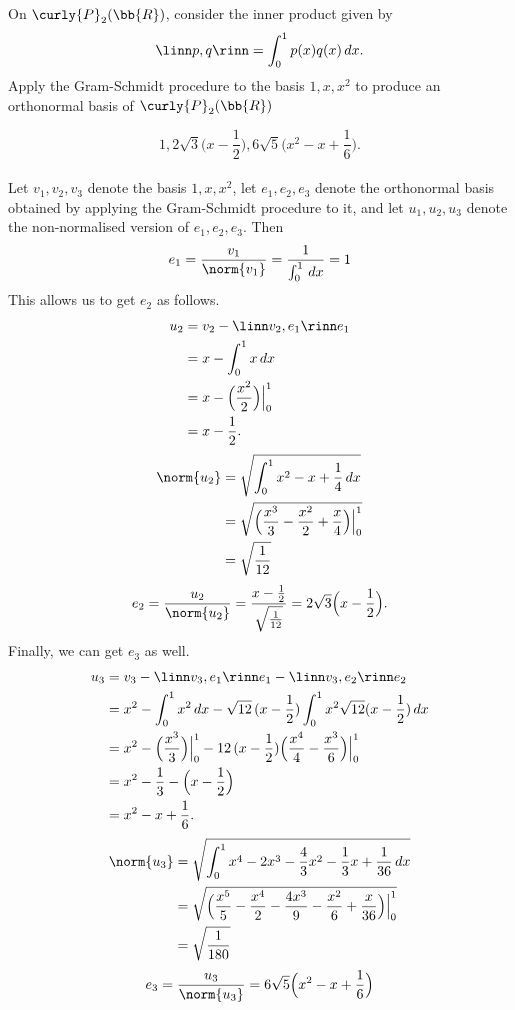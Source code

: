 \documentclass[12pt, letterpaper]{hmcpset}
\begin{document}
\pagebreak

\begin{problem}[5]
	On $\curly{P}_2(\bb{R})$, consider the inner product given by
	\[
		\linn p, q \rinn = \int_0^1 p(x) q(x) \, dx.
	\]
	Apply the Gram-Schmidt procedure to the basis $1, x, x^2$ to produce an orthonormal basis of $\curly{P}_2(\bb{R})$
\end{problem}

\begin{solution}
	\[
		\boxed{
			1, 2 \sqrt 3 \Big ( x - \frac{1}{2} \Big ), 6 \sqrt 5 \Big ( x^2 - x + \frac{1}{6} \Big ).
		}
	\] \\
	Let $v_1, v_2, v_3$ denote the basis $1, x, x^2$, let $e_1, e_2, e_3$ denote the orthonormal basis obtained by applying the Gram-Schmidt procedure to it, and let $u_1, u_2, u_3$ denote the non-normalised version of $e_1, e_2, e_3$. Then
	\[
		e_1 = \frac{v_1}{\norm{v_1}} = \frac{1}{\int_0^1 \, dx} = 1
	\]
	This allows us to get $e_2$ as follows.
	\[
		\begin{split}
			u_2 & = v_2 - \linn v_2, e_1 \rinn e_1 \\
			    & = x - \int_0^1 x \, dx \\
			    & = x - \Big ( \frac{x^2}{2} \Big ) \Big |_0^1 \\
			    & = x - \frac{1}{2}.
		\end{split}
	\]
	\[
		\begin{split}
			\norm{u_2} & = \sqrt{\int_0^1 x^2 - x + \frac{1}{4} \, dx} \\
				   & = \sqrt{\Big ( \frac{x^3}{3} - \frac{x^2}{2} + \frac{x}{4} \Big ) \Big |_0^1} \\
				   & = \sqrt{\frac{1}{12}}
		\end{split}
	\]
	\[
		e_2 = \frac{u_2}{\norm{u_2}} \\ = \frac{x - \frac{1}{2}}{\sqrt{\frac{1}{12}}} = 2 \sqrt{3} \Big ( x - \frac{1}{2} \Big ).
	\]
	Finally, we can get $e_3$ as well.
	\[
		\begin{split}
			u_3 & = v_3 - \linn v_3, e_1 \rinn e_1 - \linn v_3, e_2 \rinn e_2 \\
			    & = x^2 - \int_0^1 x^2 \, dx - \sqrt{12} \, (x - \frac{1}{2}) \int_0^1 x^2 \sqrt{12} (x - \frac{1}{2}) \, dx \\
			    & = x^2 - \Big ( \frac{x^3}{3} \Big ) \Big |_0^1 - 12 \, (x - \frac{1}{2}) \Big ( \frac{x^4}{4} - \frac{x^3}{6} \Big ) \Big |_0^1 \\
			    & = x^2 - \frac{1}{3} - \Big ( x - \frac{1}{2} \Big ) \\
			    & = x^2 - x + \frac{1}{6}.
		\end{split}
	\]
	\[
		\begin{split}
			\norm{u_3} & = \sqrt{\int_0^1 x^4 - 2x^3 - \frac{4}{3} x^2 - \frac{1}{3} x + \frac{1}{36} \, dx} \\
				   & = \sqrt{\Big ( \frac{x^5}{5} - \frac{x^4}{2} - \frac{4 x^3}{9} - \frac{x^2}{6} + \frac{x}{36} \Big ) \Big |_0^1} \\
				   & = \sqrt{\frac{1}{180}}
		\end{split}
	\]
	\[
		e_3 = \frac{u_3}{\norm{u_3}} = 6 \sqrt{5} \Big (x^2 - x + \frac{1}{6} \Big )
	\]
\end{solution}
\end{document}
